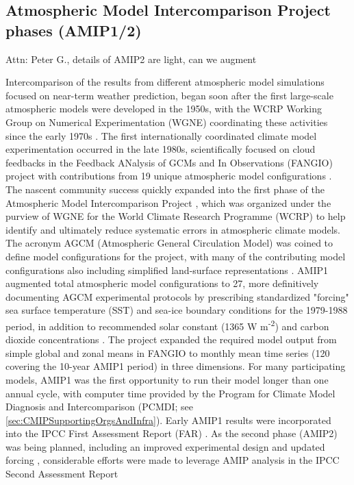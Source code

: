 \documentclass[gmd, preprint]{copernicus}
\newcommand{\mycomment}[1]{}
\def\cred#1{{\color{red}#1}}
\begin{document}
\mycomment{
1955-65: Establishment of Atmospheric General Circulation Modelling
http://pne.people.si.umich.edu/sloan/1955_65.html
Establishment of the IPCC UNEP 70th plenary meeting 6 December 1988
https://documents.un.org/doc/resolution/gen/nr0/530/32/img/nr053032.pdf?OpenElement
}

\subsection{Atmospheric Model Intercomparison Project phases (AMIP1/2)}
\label{sec:amip1And2}
\cred{Attn: Peter G., details of AMIP2 are light, can we augment}

Intercomparison of the results from different atmospheric model simulations focused on near-term weather prediction, began soon after the first large-scale atmospheric models were developed in the 1950s, with the WCRP Working Group on Numerical Experimentation (WGNE) coordinating these activities since the early 1970s \citep{gates_ams_1992}. The first internationally coordinated climate model experimentation occurred in the late 1980s, scientifically focused on cloud feedbacks in the Feedback ANalysis of GCMs and In Observations (FANGIO) project with contributions from 19 unique atmospheric model configurations \citep{cess_methodology_1988, cess_interpretation_1989, cess_intercomparison_1990, cess_first_1991}. The nascent community success quickly expanded into the first phase of the Atmospheric Model Intercomparison Project \citep[AMIP, hereafter referred to as AMIP1;][]{gates_amip_1992}, which was organized under the purview of WGNE for the World Climate Research Programme (WCRP) to help identify and ultimately reduce systematic errors in atmospheric climate models. The acronym AGCM (Atmospheric General Circulation Model) was coined to define model configurations for the project, with many of the contributing model configurations also including simplified land-surface representations \citep[e.g.,][]{budyko_heat_1961,manabe_climate_1969,vargas_godoy_global_2021}. AMIP1 augmented total atmospheric model configurations to 27, more definitively documenting AGCM experimental protocols by prescribing standardized "forcing" sea surface temperature (SST) and sea-ice boundary conditions for the 1979-1988 period, in addition to recommended solar constant (1365 W m\textsuperscript{-2}) and carbon dioxide concentrations \citep[345 ppm;][]{gates_amip_1991}. The project expanded the required model output from simple global and zonal means in FANGIO to monthly mean time series (120 covering the 10-year AMIP1 period) in three dimensions. For many participating models, AMIP1 was the first opportunity to run their model longer than one annual cycle, with computer time provided by the Program for Climate Model Diagnosis and Intercomparison (PCMDI; see \autoref{sec:CMIPSupportingOrgsAndInfra}). Early AMIP1 results were incorporated into the IPCC First Assessment Report (FAR) \citep{gates_validation_1990}. As the second phase (AMIP2) was being planned, including an improved experimental design and updated forcing \citep{liang_pcmdi_1997, taylor_pcmdi_2000}, considerable efforts were made to leverage AMIP analysis in the IPCC Second Assessment Report 
\end{document}
